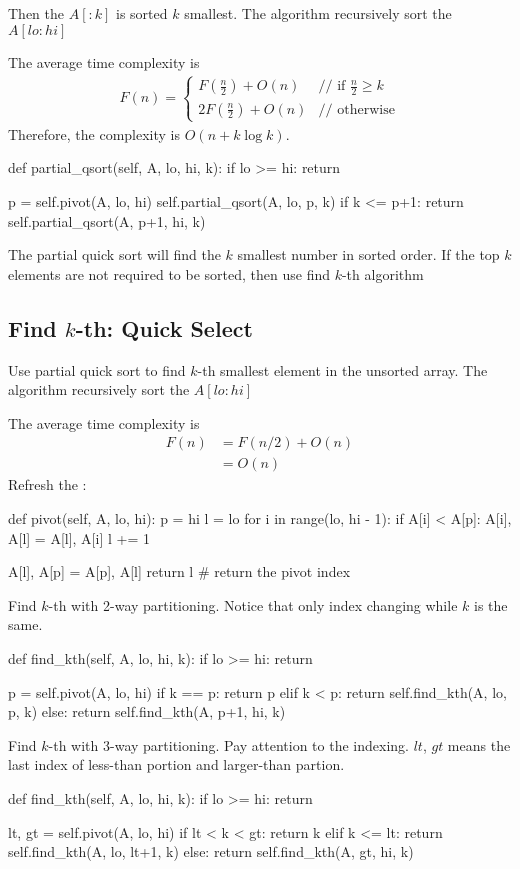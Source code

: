   Then the $A[:k]$ is sorted $k$ smallest. The algorithm recursively sort the $A[lo:hi]$

The average time complexity is
\begin{eqnarray*}
F(n) = \left\{ \begin{array}{rl}
  F(\frac{n}{2})+O(n) &\mbox{// if $\frac{n}{2} \geq k$} \\
  2F(\frac{n}{2})+O(n) &\mbox{// otherwise}
       \end{array} \right.
\end{eqnarray*}
Therefore, the complexity is $O(n+k \log k)$.
\begin{python}
def partial_qsort(self, A, lo, hi, k):
    if lo >= hi:
      return

    p = self.pivot(A, lo, hi)
    self.partial_qsort(A, lo, p, k)
    if k <= p+1:
      return
    self.partial_qsort(A, p+1, hi, k)
\end{python}
The partial quick sort will find the $k$ smallest number in sorted order. If the top $k$ elements are not required to be sorted, then use find $k$-th algorithm 

\subsection{Find $k$-th: Quick Select}
Use partial quick sort to find $k$-th smallest element in the unsorted array. The algorithm recursively sort the $A[lo:hi]$

The average time complexity is
\begin{align*}
F(n) &= F(n/2) + O(n) \\
&= O(n)
\end{align*}
Refresh the :
\begin{python}
def pivot(self, A, lo, hi):
    p = hi
    l = lo
    for i in range(lo, hi - 1):
        if A[i] < A[p]:
            A[i], A[l] = A[l], A[i]
            l += 1
            
    A[l], A[p] = A[p], A[l]
    return l  # return the pivot index
\end{python}
Find $k$-th with 2-way partitioning. Notice that only index changing while $k$ is the same.
\begin{python}
def find_kth(self, A, lo, hi, k):
    if lo >= hi:
      return
    
    p = self.pivot(A, lo, hi)
    if k == p:
      return p
    elif k < p:
      return self.find_kth(A, lo, p, k)
    else:
      return self.find_kth(A, p+1, hi, k)
\end{python}
Find $k$-th with 3-way partitioning. Pay attention to the indexing. $lt$, $gt$ means the last index of less-than portion and larger-than partion. 
\begin{python}
def find_kth(self, A, lo, hi, k):
    if lo >= hi:
      return

    lt, gt = self.pivot(A, lo, hi)
    if lt < k < gt:
      return k
    elif k <= lt:
      return self.find_kth(A, lo, lt+1, k)
    else:
      return self.find_kth(A, gt, hi, k)
\end{python}

